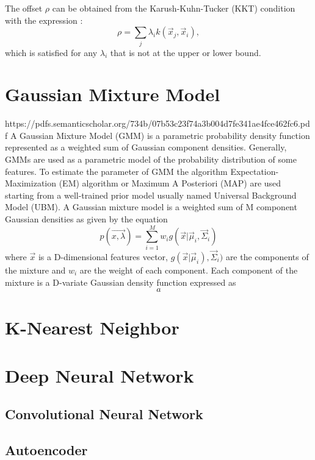 The offset $\rho$ can be obtained from the Karush-Kuhn-Tucker (KKT) condition with the expression \cite{boyd2004convex}:
\begin{equation}
\rho = \sum_j \lambda_i k(\vec{x}_j,\vec{x}_i),
\end{equation}
which is satisfied for any $\lambda_i$ that is not at the upper or lower bound.



\section{Gaussian Mixture Model}
https://pdfs.semanticscholar.org/734b/07b53c23f74a3b004d7fe341ae4fce462fc6.pdf
A Gaussian Mixture Model (GMM) is a parametric probability density function represented as a weighted sum of Gaussian component densities. Generally, GMMs are used as a parametric model of the probability distribution of some features.  To estimate the parameter of GMM the algorithm Expectation-Maximization (EM) algorithm or Maximum A Posteriori (MAP)  are used starting from a well-trained prior model usually named Universal Background Model (UBM).
A Gaussian mixture model is a weighted sum of M component Gaussian densities as given by the equation
\begin{equation}
p(\vec{x, \lambda}) = \sum_{i = 1}^{M} w_i g(\vec{x} |\vec{\mu}_i, \vec{\Sigma}_i)
\end{equation}
where $\vec{x}$ is a D-dimensional features vector, $g (\vec{x} |\vec{\mu}_i), \vec{\Sigma}_i)$ are the components of the mixture and $w_i$ are the weight of each component. Each component of the mixture is a D-variate Gaussian density function expressed as
\begin{equation}
a
\end{equation}
\section{K-Nearest Neighbor}
\section{Deep Neural Network}
\subsection{Convolutional Neural Network}
\subsection{Autoencoder}


